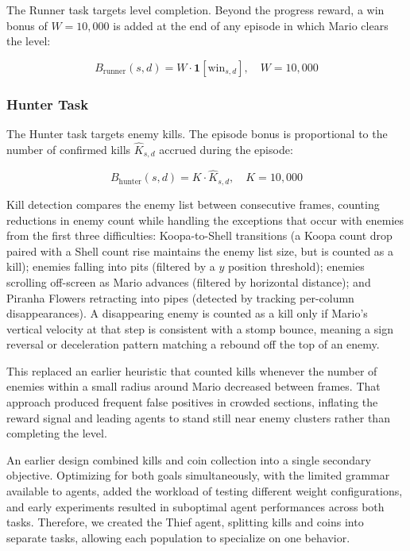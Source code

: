\documentclass[runningheads]{llncs}
\begin{document}
The Runner task targets level completion. Beyond the progress reward, a win bonus of $W = 10{,}000$ is added at the end of any episode in which Mario clears the level:

\begin{equation}
B_{\text{runner}}(s,d) = W \cdot \mathbf{1}[\text{win}_{s,d}], \quad W = 10{,}000
\end{equation}

\subsubsection{Hunter Task}

The Hunter task targets enemy kills. The episode bonus is proportional to the number of confirmed kills $\hat{K}_{s,d}$ accrued during the episode:

\begin{equation}
B_{\text{hunter}}(s,d) = K \cdot \hat{K}_{s,d}, \quad K = 10{,}000
\end{equation}

Kill detection compares the enemy list between consecutive frames, counting reductions in enemy count while handling the exceptions that occur with enemies from the first three difficulties: Koopa-to-Shell transitions (a Koopa count drop paired with a Shell count rise maintains the enemy list size, but is counted as a kill); enemies falling into pits (filtered by a $y$ position threshold); enemies scrolling off-screen as Mario advances (filtered by horizontal distance); and Piranha Flowers retracting into pipes (detected by tracking per-column disappearances). A disappearing enemy is counted as a kill only if Mario's vertical velocity at that step is consistent with a stomp bounce, meaning a sign reversal or deceleration pattern matching a rebound off the top of an enemy.

This replaced an earlier heuristic that counted kills whenever the number of enemies within a small radius around Mario decreased between frames. That approach produced frequent false positives in crowded sections, inflating the reward signal and leading agents to stand still near enemy clusters rather than completing the level.

An earlier design combined kills and coin collection into a single secondary objective. Optimizing for both goals simultaneously, with the limited grammar available to agents, added the workload of testing different weight configurations, and early experiments resulted in suboptimal agent performances across both tasks. Therefore, we created the Thief agent, splitting kills and coins into separate tasks, allowing each population to specialize on one behavior.
\end{document}
